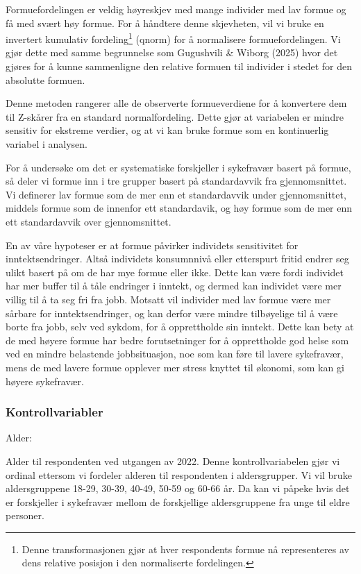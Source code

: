 \documentclass[
  12pt,
  a4paper,
  DIV=11,
  numbers=noendperiod]{scrartcl}
\begin{document}
Formuefordelingen er veldig høyreskjev med mange individer med lav
formue og få med svært høy formue. For å håndtere denne skjevheten, vil
vi bruke en invertert kumulativ fordeling\footnote{Denne
  transformasjonen gjør at hver respondents formue nå representeres av
  dens relative posisjon i den normaliserte fordelingen.} (qnorm) for å
normalisere formuefordelingen. Vi gjør dette med samme begrunnelse som
Gugushvili \& Wiborg (2025) hvor det gjøres for å kunne sammenligne den
relative formuen til individer i stedet for den absolutte formuen.

Denne metoden rangerer alle de observerte formueverdiene for å
konvertere dem til Z-skårer fra en standard normalfordeling. Dette gjør
at variabelen er mindre sensitiv for ekstreme verdier, og at vi kan
bruke formue som en kontinuerlig variabel i analysen.

For å undersøke om det er systematiske forskjeller i sykefravær basert
på formue, så deler vi formue inn i tre grupper basert på standardavvik
fra gjennomsnittet. Vi definerer lav formue som de mer enn et
standardavvik under gjennomsnittet, middels formue som de innenfor ett
standardavik, og høy formue som de mer enn ett standardavvik over
gjennomsnittet.

En av våre hypoteser er at formue påvirker individets sensitivitet for
inntektsendringer. Altså individets konsumnnivå eller etterspurt fritid
endrer seg ulikt basert på om de har mye formue eller ikke. Dette kan
være fordi individet har mer buffer til å tåle endringer i inntekt, og
dermed kan individet være mer villig til å ta seg fri fra jobb. Motsatt
vil individer med lav formue være mer sårbare for inntektsendringer, og
kan derfor være mindre tilbøyelige til å være borte fra jobb, selv ved
sykdom, for å opprettholde sin inntekt. Dette kan bety at de med høyere
formue har bedre forutsetninger for å opprettholde god helse som ved en
mindre belastende jobbsituasjon, noe som kan føre til lavere sykefravær,
mens de med lavere formue opplever mer stress knyttet til økonomi, som
kan gi høyere sykefravær.

\subsubsection{Kontrollvariabler}\label{kontrollvariabler}

Alder:

Alder til respondenten ved utgangen av 2022. Denne kontrollvariabelen
gjør vi ordinal ettersom vi fordeler alderen til respondenten i
aldersgrupper. Vi vil bruke aldersgruppene 18-29, 30-39, 40-49, 50-59 og
60-66 år. Da kan vi påpeke hvis det er forskjeller i sykefravær mellom
de forskjellige aldersgruppene fra unge til eldre personer.
\end{document}
